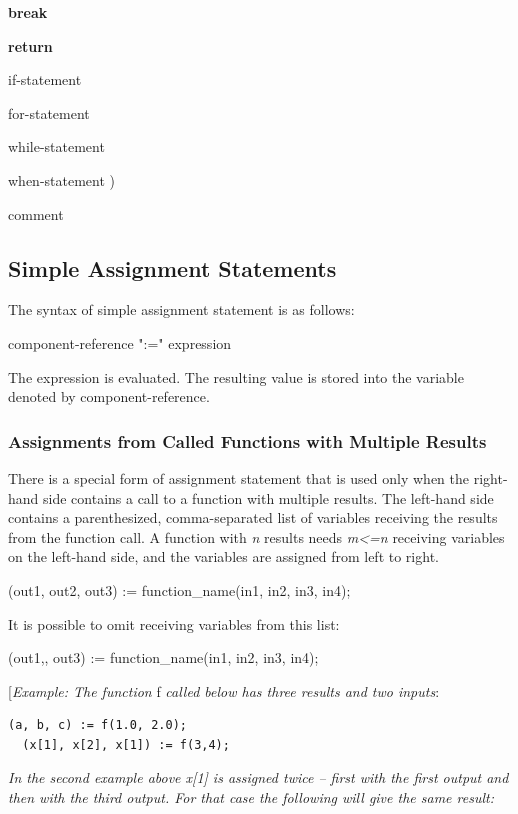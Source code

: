 \documentclass[10pt,a4paper]{report}
\def\doublelabel#1{\label{#1}}
\begin{document}
\textbar{} \textbf{break}

\textbar{} \textbf{return}

\textbar{} if-statement

\textbar{} for-statement

\textbar{} while-statement

\textbar{} when-statement )

comment

\subsection{Simple Assignment Statements}\doublelabel{simple-assignment-statements}

The syntax of simple assignment statement is as follows:

component-reference ":=" expression

The expression is evaluated. The resulting value is stored into the
variable denoted by component-reference.

\subsubsection{Assignments from Called Functions with Multiple Results}\doublelabel{assignments-from-called-functions-with-multiple-results}

There is a special form of assignment statement that is used only when
the right-hand side contains a call to a function with multiple results.
The left-hand side contains a parenthesized, comma-separated list of
variables receiving the results from the function call. A function with
\emph{n} results needs \emph{m\textless{}=n} receiving variables on the
left-hand side, and the variables are assigned from left to right.

(out1, out2, out3) := function\_name(in1, in2, in3, in4);

It is possible to omit receiving variables from this list:

(out1,, out3) := function\_name(in1, in2, in3, in4);

{[}\emph{Example: The function} f \emph{called below has three results
and two inputs}:

\begin{lstlisting}[language=modelica]
  (a, b, c) := f(1.0, 2.0);
  (x[1], x[2], x[1]) := f(3,4);
\end{lstlisting}
\emph{In the second example above x{[}1{]} is assigned twice -- first
with the first output and then with the third output. For that case the
following will give the same result:}
\end{document}
